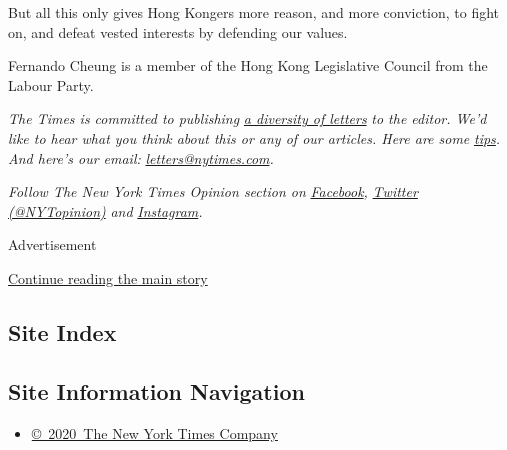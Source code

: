 But all this only gives Hong Kongers more reason, and more conviction,
to fight on, and defeat vested interests by defending our values.

Fernando Cheung is a member of the Hong Kong Legislative Council from
the Labour Party.

\emph{The Times is committed to publishing}
\href{https://www.nytimes.com/2019/01/31/opinion/letters/letters-to-editor-new-york-times-women.html}{\emph{a
diversity of letters}} \emph{to the editor. We'd like to hear what you
think about this or any of our articles. Here are some}
\href{https://help.nytimes.com/hc/en-us/articles/115014925288-How-to-submit-a-letter-to-the-editor}{\emph{tips}}\emph{.
And here's our email:}
\href{mailto:letters@nytimes.com}{\emph{letters@nytimes.com}}\emph{.}

\emph{Follow The New York Times Opinion section on}
\href{https://www.facebook.com/nytopinion}{\emph{Facebook}}\emph{,}
\href{http://twitter.com/NYTOpinion}{\emph{Twitter (@NYTopinion)}}
\emph{and}
\href{https://www.instagram.com/nytopinion/}{\emph{Instagram}}\emph{.}

Advertisement

\protect\hyperlink{after-bottom}{Continue reading the main story}

\hypertarget{site-index}{%
\subsection{Site Index}\label{site-index}}

\hypertarget{site-information-navigation}{%
\subsection{Site Information
Navigation}\label{site-information-navigation}}

\begin{itemize}
\tightlist
\item
  \href{https://help.nytimes.com/hc/en-us/articles/115014792127-Copyright-notice}{©~2020~The
  New York Times Company}
\end{itemize}

